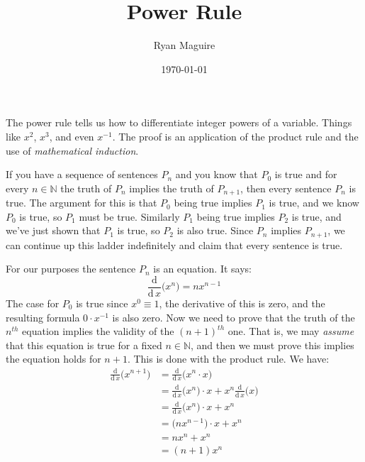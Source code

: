 \documentclass{article}
\title{Power Rule}
\author{Ryan Maguire}
\date{\today}
\theoremstyle{plain}
\begin{document}
    \maketitle
    The power rule tells us how to differentiate integer powers of a variable.
    Things like $x^{2}$, $x^{3}$, and even $x^{-1}$. The proof is an
    application of the product rule and the use of
    \textit{mathematical induction}.
    \par\hfill\par
    If you have a sequence of sentences
    $P_{n}$ and you know that $P_{0}$ is true and for every $n\in\mathbb{N}$
    the truth of $P_{n}$ implies the truth of $P_{n+1}$, then every sentence
    $P_{n}$ is true. The argument for this is that $P_{0}$ being true implies
    $P_{1}$ is true, and we know $P_{0}$ is true, so $P_{1}$ must be true.
    Similarly $P_{1}$ being true implies $P_{2}$ is true, and we've just shown
    that $P_{1}$ is true, so $P_{2}$ is also true. Since $P_{n}$ implies
    $P_{n+1}$, we can continue up this ladder indefinitely and claim that every
    sentence is true.
    \par\hfill\par
    For our purposes the sentence $P_{n}$ is an equation. It says:
    \begin{equation}
        \frac{\textrm{d}}{\textrm{d}\,x}\big(x^{n}\big)=nx^{n-1}
    \end{equation}
    The case for $P_{0}$ is true since $x^{0}\equiv{1}$, the derivative of this
    is zero, and the resulting formula $0\cdot{x}^{-1}$ is also zero.
    Now we need to prove that the truth of the $n^{th}$ equation implies the
    validity of the $(n+1)^{th}$ one. That is, we may \textit{assume} that
    this equation is true for a fixed $n\in\mathbb{N}$, and then we must prove
    this implies the equation holds for $n+1$. This is done with the product
    rule. We have:
    \begin{align}
        \frac{\textrm{d}}{\textrm{d}\,x}\big(x^{n+1}\big)
        &=\frac{\textrm{d}}{\textrm{d}\,x}\big(x^{n}\cdot{x}\big)
            \tag{Definition}\\
        &=\frac{\textrm{d}}{\textrm{d}\,x}\big(x^{n}\big)\cdot{x}
            +x^{n}\frac{\textrm{d}}{\textrm{d}\,x}\big(x\big)
                \tag{Product Rule}\\
        &=\frac{\textrm{d}}{\textrm{d}\,x}\big(x^{n}\big)\cdot{x}+x^{n}
                \tag{Derivative of $x$}\\
        &=\big(nx^{n-1}\big)\cdot{x}+x^{n}
            \tag{Induction Hypothesis}\\
        &=nx^{n}+x^{n}
            \tag{Simplify}\\
        &=(n+1)x^{n}
            \tag{Simplify}
    \end{align}
\end{document}
